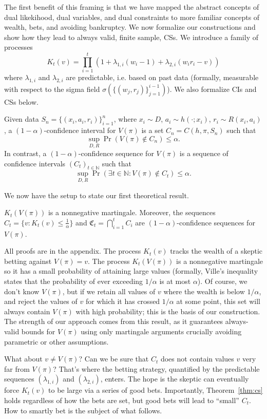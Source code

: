 The first benefit of this framing is that we have mapped the abstract concepts
of dual likekihood, dual variables, and dual constraints to more familiar
concepts of wealth, bets, and avoiding bankruptcy.  We now formalize our
constructions and show how they lead to always valid, finite sample, CSs. We
introduce a family of processes
\[
K_t(v) = \prod_{i=1}^t (1+\lambda_{1,i} (w_i-1) +\lambda_{2,i}(w_i r_i - v))
\]
where $\lambda_{1,i}$ and $\lambda_{2,i}$ are predictable, i.e. based on past data (formally, measurable with
respect to the sigma field $\sigma(\{(w_j,r_j)\}_{j=1}^{i-1})$).  We also formalize CIs and CSs below.
\begin{definition}
Given data $S_n=\{(x_i,a_i,r_i)\}_{i=1}^n$, where 
$x_i \sim D$, $a_i\sim h(\cdot;x_i)$,  $r_i \sim R(x_i,a_i)$, 
a $(1-\alpha)$-confidence interval 
for $V(\pi)$ is a set $C_n = C(h,\pi,S_n)$ such that
\[
\sup_{D,R} \Pr(V(\pi) \notin C_n) \leq \alpha.
\]
In contrast, a $(1-\alpha)$-confidence sequence for $V(\pi)$ 
is a sequence of confidence intervals $(C_t)_{t \in \mathbb{N}}$ such that
\[
\sup_{D,R} \Pr(\exists t \in \mathbb{N}: V(\pi) \notin C_t) \leq \alpha.
\]
\end{definition}

We now have the setup to state our first theoretical result.
\begin{theorem}
\label{thm:martingale}
\label{thm:ville}
\label{thm:cs}
$K_t(V(\pi))$ is a nonnegative martingale. Moreover,
the sequences $C_t = \{v:K_t(v)\leq \frac{1}{\alpha}\}$ 
and $\mathfrak{C}_t = \bigcap_{i=1}^t C_i$
are $(1-\alpha)$-confidence sequences for $V(\pi)$.
\end{theorem}

All proofs are in the appendix.  
The process $K_t(v)$
tracks the wealth of a skeptic betting against $V(\pi)=v$. The process
$K_t(V(\pi))$ is a nonnegative martingale so it has a small probability of attaining large values (formally, Ville's inequality states that the probability of ever exceeding $1/\alpha$ is at most $\alpha$). 
Of course, we don't know $V(\pi)$, but if we retain all values of $v$ where the wealth is below $1/\alpha$, and reject the values of $v$ for which it has crossed $1/\alpha$ at some point, this set will always contain $V(\pi)$ with high probability; this is the basis of our construction.
The strength of our approach comes from this result, 
as it guarantees always-valid bounds for $V(\pi)$ using 
only martingale arguments crucially avoiding
parametric or other assumptions.

What about $v \neq V(\pi)$? Can we be sure that $C_t$ does not contain values $v$ very far from $V(\pi)$? That's where the betting strategy, quantified by the predictable sequences $(\lambda_{1,i})$ and $(\lambda_{2,i})$, enters. The hope is the skeptic can eventually 
force $K_t(v)$ to be large via a series of good bets. 
Importantly, Theorem~\ref{thm:cs} holds regardless of how the bets are set,
but good bets will lead to ``small'' $C_t$.
How to smartly bet is the subject of what
follows.


